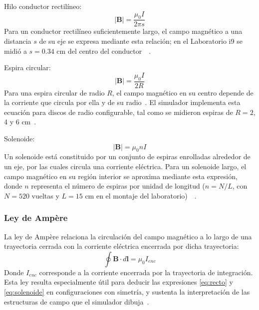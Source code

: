 \documentclass{article}
\begin{document}
Hilo conductor rectilíneo:
\begin{equation}
    |\boldsymbol{B}| = \frac{\mu_0 I}{2\pi s}
    \label{eq:recto}
\end{equation}
Para un conductor rectilíneo suficientemente largo, el campo magnético a una distancia $s$ de su eje se expresa mediante esta relación; en el Laboratorio i9 se midió a $s = 0.34$ cm del centro del conductor~\cite{labi9rep}~\cite{young2009}.

Espira circular:
\begin{equation}
    |\boldsymbol{B}| = \frac{\mu_0 I}{2R}
    \label{eq:espira}
\end{equation}
Para una espira circular de radio $R$, el campo magnético en su centro depende de la corriente que circula por ella y de su radio~\cite{young2009}. El simulador implementa esta ecuación para discos de radio configurable, tal como se midieron espiras de $R = 2$, 4 y 6 cm~\cite{labi9rep}.

Solenoide:
\begin{equation}
    |\boldsymbol{B}| = \mu_0 n I
    \label{eq:solenoide}
\end{equation}
Un solenoide está constituido por un conjunto de espiras enrolladas alrededor de un eje, por las cuales circula una corriente eléctrica. Para un solenoide largo, el campo magnético en su región interior se aproxima mediante esta expresión, donde $n$ representa el número de espiras por unidad de longitud ($n = N/L$, con $N = 520$ vueltas y $L = 15$ cm en el montaje del laboratorio)~\cite{labi9rep}~\cite{young2009}.

\subsubsection{Ley de Ampère}

La ley de Ampère relaciona la circulación del campo magnético a lo largo de una trayectoria cerrada con la corriente eléctrica encerrada por dicha trayectoria:
\begin{equation}
    \oint \boldsymbol{B} \cdot d\boldsymbol{l} = \mu_0 I_{enc}
    \label{eq:ampere}
\end{equation}
Donde $I_{enc}$ corresponde a la corriente encerrada por la trayectoria de integración. Esta ley resulta especialmente útil para deducir las expresiones \eqref{eq:recto} y \eqref{eq:solenoide} en configuraciones con simetría, y sustenta la interpretación de las estructuras de campo que el simulador dibuja~\cite{giancoli2009}.
\end{document}
